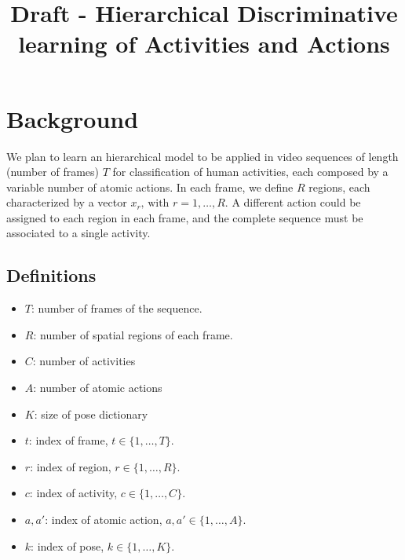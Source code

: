 \documentclass[10pt,letterpaper]{article}
\newcommand{\+}[1]{\ensuremath{{\boldsymbol #1}}}
\begin{document}
\title{Draft - Hierarchical Discriminative learning of Activities and Actions}


\maketitle

\section{Background}
We plan to learn an hierarchical model to be applied in video sequences of length (number of frames) $T$ for classification of human activities, each composed by a variable number of atomic actions. In each frame, we define $R$ regions, each characterized by a vector $x_r \text{, with } r=1,\dots,R$. A different action could be assigned to each region in each frame, and the complete sequence must be associated to a single activity. 

\subsection{Definitions}
\begin{itemize}
\item $T$: number of frames of the sequence.
\item $R$: number of spatial regions of each frame.
\item $C$: number of activities
\item $A$: number of atomic actions
\item $K$: size of pose dictionary
\item $t$: index of frame, $t \in \{1,\dots,T\}$.
\item $r$: index of region, $r \in \{1,\dots,R\}$.
\item $c$: index of activity, $c \in \{1,\dots,C\}$.
\item $a,a'$: index of atomic action, $a,a' \in \{1,\dots,A\}$.
\item $k$: index of pose, $k \in \{1,\dots,K\}$.
\end{itemize}
\end{document}
